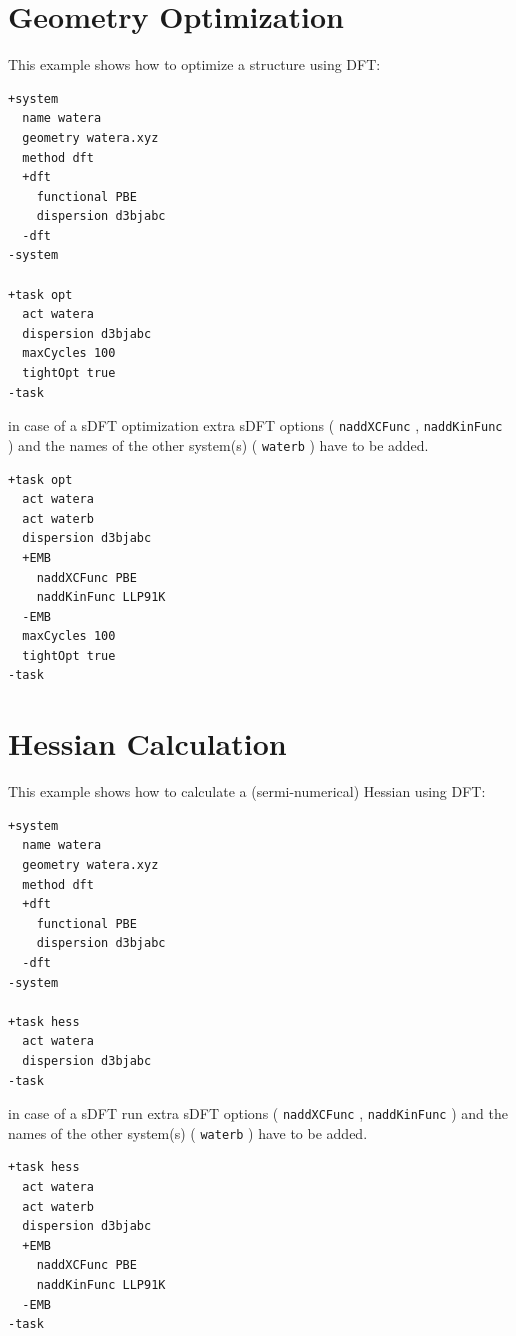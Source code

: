 \documentclass[bibliography=totocnumbered,a4paper,10pt,oneside]{scrbook}
\newcommand{\ttt}[1]{%
  \begingroup\setlength{\fboxsep}{1pt}%
  \colorbox{serenity-green!30}{\texttt{\hspace*{2pt}\vphantom{(g}#1\hspace*{2pt}}}%
  \endgroup
}
\begin{document}
\section{Geometry Optimization}
This example shows how to optimize a structure using DFT:
\begin{lstlisting}
+system
  name watera
  geometry watera.xyz
  method dft
  +dft
    functional PBE
    dispersion d3bjabc
  -dft
-system

+task opt
  act watera
  dispersion d3bjabc
  maxCycles 100
  tightOpt true
-task
\end{lstlisting}
in case of a sDFT optimization extra sDFT options (\ttt{naddXCFunc},\ttt{naddKinFunc}) and the names of the other system(s) (\ttt{waterb}) have to be added.
\begin{lstlisting}
+task opt
  act watera
  act waterb
  dispersion d3bjabc
  +EMB
    naddXCFunc PBE
    naddKinFunc LLP91K
  -EMB
  maxCycles 100
  tightOpt true
-task
\end{lstlisting}

\section{Hessian Calculation}
This example shows how to calculate a (sermi-numerical) Hessian using DFT:
\begin{lstlisting}
+system
  name watera
  geometry watera.xyz
  method dft
  +dft
    functional PBE
    dispersion d3bjabc
  -dft
-system

+task hess
  act watera
  dispersion d3bjabc
-task

\end{lstlisting}
in case of a sDFT run extra sDFT options (\ttt{naddXCFunc}, \ttt{naddKinFunc}) and the names of the other system(s) (\ttt{waterb}) have to be added.
\begin{lstlisting}
+task hess
  act watera
  act waterb
  dispersion d3bjabc
  +EMB
    naddXCFunc PBE
    naddKinFunc LLP91K
  -EMB
-task
\end{lstlisting}
\end{document}
